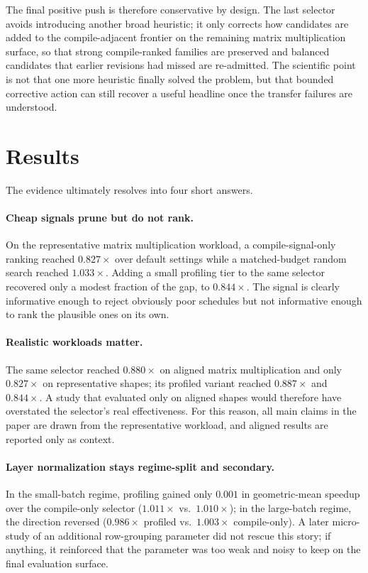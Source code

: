 \documentclass[10pt,twocolumn]{article}
\begin{document}
The final positive push is therefore conservative by design. The last selector avoids introducing another broad heuristic; it only corrects how candidates are added to the compile-adjacent frontier on the remaining matrix multiplication surface, so that strong compile-ranked families are preserved and balanced candidates that earlier revisions had missed are re-admitted. The scientific point is not that one more heuristic finally solved the problem, but that bounded corrective action can still recover a useful headline once the transfer failures are understood.

\section{Results}

The evidence ultimately resolves into four short answers.

\paragraph{Cheap signals prune but do not rank.} On the representative matrix multiplication workload, a compile-signal-only ranking reached $0.827\times$ over default settings while a matched-budget random search reached $1.033\times$. Adding a small profiling tier to the same selector recovered only a modest fraction of the gap, to $0.844\times$. The signal is clearly informative enough to reject obviously poor schedules but not informative enough to rank the plausible ones on its own.

\paragraph{Realistic workloads matter.} The same selector reached $0.880\times$ on aligned matrix multiplication and only $0.827\times$ on representative shapes; its profiled variant reached $0.887\times$ and $0.844\times$. A study that evaluated only on aligned shapes would therefore have overstated the selector's real effectiveness. For this reason, all main claims in the paper are drawn from the representative workload, and aligned results are reported only as context.

\paragraph{Layer normalization stays regime-split and secondary.} In the small-batch regime, profiling gained only $0.001$ in geometric-mean speedup over the compile-only selector ($1.011\times$ vs.\ $1.010\times$); in the large-batch regime, the direction reversed ($0.986\times$ profiled vs.\ $1.003\times$ compile-only). A later micro-study of an additional row-grouping parameter did not rescue this story; if anything, it reinforced that the parameter was too weak and noisy to keep on the final evaluation surface.
\end{document}
